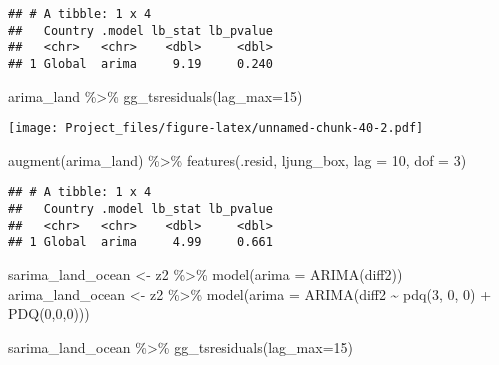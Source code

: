 \documentclass[
]{article}
\newenvironment{Shaded}{\begin{snugshade}}{\end{snugshade}}
\newcommand{\AttributeTok}[1]{\textcolor[rgb]{0.77,0.63,0.00}{#1}}
\newcommand{\DecValTok}[1]{\textcolor[rgb]{0.00,0.00,0.81}{#1}}
\newcommand{\FunctionTok}[1]{\textcolor[rgb]{0.00,0.00,0.00}{#1}}
\newcommand{\NormalTok}[1]{#1}
\newcommand{\OtherTok}[1]{\textcolor[rgb]{0.56,0.35,0.01}{#1}}
\newcommand{\SpecialCharTok}[1]{\textcolor[rgb]{0.00,0.00,0.00}{#1}}
\begin{document}
\begin{verbatim}
## # A tibble: 1 x 4
##   Country .model lb_stat lb_pvalue
##   <chr>   <chr>    <dbl>     <dbl>
## 1 Global  arima     9.19     0.240
\end{verbatim}

\begin{Shaded}
\begin{Highlighting}[]
\NormalTok{arima\_land }\SpecialCharTok{\%\textgreater{}\%} \FunctionTok{gg\_tsresiduals}\NormalTok{(}\AttributeTok{lag\_max=}\DecValTok{15}\NormalTok{)}
\end{Highlighting}
\end{Shaded}

\texttt{[image: Project\_files/figure-latex/unnamed-chunk-40-2.pdf]}

\begin{Shaded}
\begin{Highlighting}[]
\FunctionTok{augment}\NormalTok{(arima\_land) }\SpecialCharTok{\%\textgreater{}\%}
  \FunctionTok{features}\NormalTok{(.resid, ljung\_box, }\AttributeTok{lag =} \DecValTok{10}\NormalTok{, }\AttributeTok{dof =} \DecValTok{3}\NormalTok{)}
\end{Highlighting}
\end{Shaded}

\begin{verbatim}
## # A tibble: 1 x 4
##   Country .model lb_stat lb_pvalue
##   <chr>   <chr>    <dbl>     <dbl>
## 1 Global  arima     4.99     0.661
\end{verbatim}

\begin{Shaded}
\begin{Highlighting}[]
\NormalTok{sarima\_land\_ocean }\OtherTok{\textless{}{-}}\NormalTok{ z2 }\SpecialCharTok{\%\textgreater{}\%}  \FunctionTok{model}\NormalTok{(}\AttributeTok{arima =} \FunctionTok{ARIMA}\NormalTok{(diff2)) }
\NormalTok{arima\_land\_ocean }\OtherTok{\textless{}{-}}\NormalTok{ z2 }\SpecialCharTok{\%\textgreater{}\%}  \FunctionTok{model}\NormalTok{(}\AttributeTok{arima =} \FunctionTok{ARIMA}\NormalTok{(diff2 }\SpecialCharTok{\textasciitilde{}} \FunctionTok{pdq}\NormalTok{(}\DecValTok{3}\NormalTok{, }\DecValTok{0}\NormalTok{, }\DecValTok{0}\NormalTok{) }\SpecialCharTok{+} \FunctionTok{PDQ}\NormalTok{(}\DecValTok{0}\NormalTok{,}\DecValTok{0}\NormalTok{,}\DecValTok{0}\NormalTok{))) }


\NormalTok{sarima\_land\_ocean }\SpecialCharTok{\%\textgreater{}\%} \FunctionTok{gg\_tsresiduals}\NormalTok{(}\AttributeTok{lag\_max=}\DecValTok{15}\NormalTok{)}
\end{Highlighting}
\end{Shaded}
\end{document}
